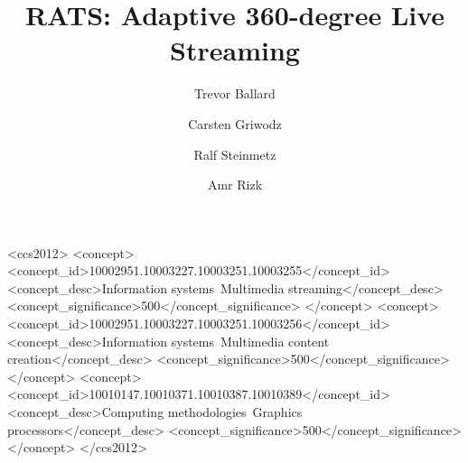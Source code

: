 \documentclass[sigconf]{acmart}
\begin{document}
\title{RATS: Adaptive 360-degree Live Streaming}


\author{Trevor Ballard}

\author{Carsten Griwodz}

\author{Ralf Steinmetz}

\author{Amr Rizk}

%


\begin{abstract}

\end{abstract}

%
%
 \begin{CCSXML}
	<ccs2012>
	<concept>
	<concept_id>10002951.10003227.10003251.10003255</concept_id>
	<concept_desc>Information systems~Multimedia streaming</concept_desc>
	<concept_significance>500</concept_significance>
	</concept>
	<concept>
	<concept_id>10002951.10003227.10003251.10003256</concept_id>
	<concept_desc>Information systems~Multimedia content creation</concept_desc>
	<concept_significance>500</concept_significance>
	</concept>
	<concept>
	<concept_id>10010147.10010371.10010387.10010389</concept_id>
	<concept_desc>Computing methodologies~Graphics processors</concept_desc>
	<concept_significance>500</concept_significance>
	</concept>
	</ccs2012>
\end{CCSXML}

%
%


\maketitle





\end{document}
